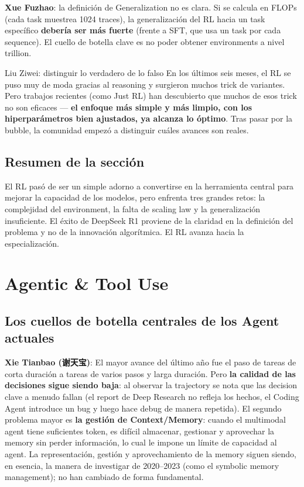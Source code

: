 \documentclass[a4paper]{article}
\begin{document}
\textbf{Xue Fuzhao}: la definición de Generalization no es clara. Si se calcula en FLOPs (cada task muestrea 1024 traces), la generalización del RL hacia un task específico \textbf{debería ser más fuerte} (frente a SFT, que usa un task por cada sequence). El cuello de botella clave es no poder obtener environments a nivel trillion.

\begin{knowledgebox}{Liu Ziwei: distinguir lo verdadero de lo falso}
En los últimos seis meses, el RL se puso muy de moda gracias al reasoning y surgieron muchos trick de variantes. Pero trabajos recientes (como Just RL) han descubierto que muchos de esos trick no son eficaces — \textbf{el enfoque más simple y más limpio, con los hiperparámetros bien ajustados, ya alcanza lo óptimo}. Tras pasar por la bubble, la comunidad empezó a distinguir cuáles avances son reales.
\end{knowledgebox}

\subsection{Resumen de la sección}
El RL pasó de ser un simple adorno a convertirse en la herramienta central para mejorar la capacidad de los modelos, pero enfrenta tres grandes retos: la complejidad del environment, la falta de scaling law y la generalización insuficiente. El éxito de DeepSeek R1 proviene de la claridad en la definición del problema y no de la innovación algorítmica. El RL avanza hacia la especialización.

\section{Agentic \& Tool Use}

\subsection{Los cuellos de botella centrales de los Agent actuales}

\textbf{Xie Tianbao (谢天宝)}: El mayor avance del último año fue el paso de tareas de corta duración a tareas de varios pasos y larga duración. Pero \textbf{la calidad de las decisiones sigue siendo baja}: al observar la trajectory se nota que las decision clave a menudo fallan (el report de Deep Research no refleja los hechos, el Coding Agent introduce un bug y luego hace debug de manera repetida). El segundo problema mayor es \textbf{la gestión de Context/Memory}: cuando el multimodal agent tiene suficientes token, es difícil almacenar, gestionar y aprovechar la memory sin perder información, lo cual le impone un límite de capacidad al agent. La representación, gestión y aprovechamiento de la memory siguen siendo, en esencia, la manera de investigar de 2020--2023 (como el symbolic memory management); no han cambiado de forma fundamental.
\end{document}
